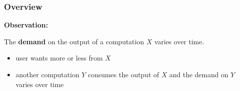 \begin{frame}
\frametitle{Overview}
\textbf{Observation:}

The \textbf{demand} on the output of a computation $X$ varies over time.
\begin{itemize}
\item \pause user wants more or less from $X$
\item \pause another computation $Y$ consumes the output of $X$ and the
  demand on $Y$ varies over time
\end{itemize}
\end{frame}
